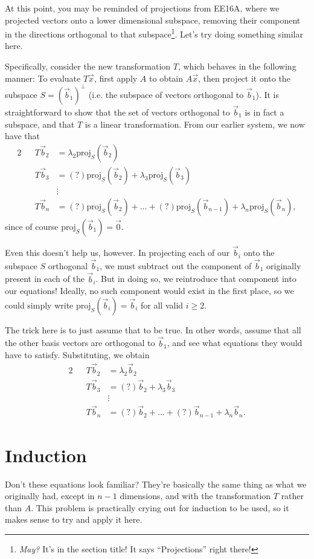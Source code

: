 \documentclass[letterpaper]{article}
\theoremstyle{remark}
\newcommand{\eqn}[1]{\begin{alignat*}{2}#1\end{alignat*}}
\begin{document}
At this point, you may be reminded of projections from EE16A, where we projected vectors onto a lower dimensional subspace, removing their component in the directions orthogonal to that subspace\footnote{\emph{May?} It's in the section title! It says ``Projections'' right there!}. Let's try doing something similar here.

Specifically, consider the new transformation $T$, which behaves in the following manner: To evaluate $T\vec{x}$, first apply $A$ to obtain $A\vec{x}$, then project it onto the subspace $S = (\vec{b}_1)^{\perp}$ (i.e. the subspace of vectors orthogonal to $\vec{b}_1$). It is straightforward to show that the set of vectors orthogonal to $\vec{b}_1$ is in fact a subspace, and that $T$ is a linear transformation. From our earlier system, we now have that
\eqn{
    && T\vec{b}_2 &= \lambda_2 \mathrm{proj}_{S}(\vec{b}_2) \\
    && T\vec{b}_3 &= (?)\mathrm{proj}_{S}(\vec{b}_2) + \lambda_3 \mathrm{proj}_{S}(\vec{b}_3) \\
    &&& \vdots \\
    && T\vec{b}_n &= (?)\mathrm{proj}_{S}(\vec{b}_2) + \ldots +  (?)\mathrm{proj}_{S}(\vec{b}_{n-1}) + \lambda_n \mathrm{proj}_{S}(\vec{b}_n),
}
since of course $\mathrm{proj}_S(\vec{b}_1) = \vec{0}$. 

Even this doesn't help us, however. In projecting each of our $\vec{b}_i$ onto the subspace $S$ orthogonal $\vec{b}_1$, we must subtract out the component of $\vec{b}_1$ originally present in each of the $\vec{b}_i$. But in doing so, we reintroduce that component into our equations! Ideally, no such component would exist in the first place, so we could simply write $\mathrm{proj}_S(\vec{b}_i) = \vec{b}_i$ for all valid $i \ge 2$.

The trick here is to just assume that to be true. In other words, assume that all the other basis vectors are orthogonal to $\vec{b}_1$, and see what equations they would have to satisfy. Substituting, we obtain
\eqn{
    && T\vec{b}_2 &= \lambda_2 \vec{b}_2 \\
    && T\vec{b}_3 &= (?)\vec{b}_2 + \lambda_3 \vec{b}_3 \\
    &&& \vdots \\
    && T\vec{b}_n &= (?)\vec{b}_2 + \ldots +  (?)\vec{b}_{n-1} + \lambda_n \vec{b}_n.
}

\section{Induction}
Don't these equations look familiar? They're basically the same thing as what we originally had, except in $n - 1$ dimensions, and with the transformation $T$ rather than $A$. This problem is practically crying out for induction to be used, so it makes sense to try and apply it here.
\end{document}
